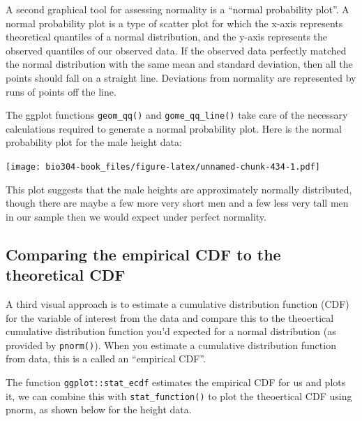 \documentclass[]{book}
\theoremstyle{definition}
\theoremstyle{definition}
\theoremstyle{definition}
\theoremstyle{remark}
\begin{document}
A second graphical tool for assessing normality is a ``normal
probability plot''. A normal probability plot is a type of scatter plot
for which the x-axis represents theoretical quantiles of a normal
distribution, and the y-axis represents the observed quantiles of our
observed data. If the observed data perfectly matched the normal
distribution with the same mean and standard deviation, then all the
points should fall on a straight line. Deviations from normality are
represented by runs of points off the line.

The ggplot functions \texttt{geom\_qq()} and \texttt{gome\_qq\_line()}
take care of the necessary calculations required to generate a normal
probability plot. Here is the normal probability plot for the male
height data:

\texttt{[image: bio304-book\_files/figure-latex/unnamed-chunk-434-1.pdf]}

This plot suggests that the male heights are approximately normally
distributed, though there are maybe a few more very short men and a few
less very tall men in our sample then we would expect under perfect
normality.

\hypertarget{comparing-the-empirical-cdf-to-the-theoretical-cdf}{%
\subsection{Comparing the empirical CDF to the theoretical
CDF}\label{comparing-the-empirical-cdf-to-the-theoretical-cdf}}

A third visual approach is to estimate a cumulative distribution
function (CDF) for the variable of interest from the data and compare
this to the theoertical cumulative distribution function you'd expected
for a normal distribution (as provided by \texttt{pnorm()}). When you
estimate a cumulative distribution function from data, this is a called
an ``empirical CDF''.

The function \texttt{ggplot::stat\_ecdf} estimates the empirical CDF for
us and plots it, we can combine this with \texttt{stat\_function()} to
plot the theoertical CDF using pnorm, as shown below for the height
data.
\end{document}
